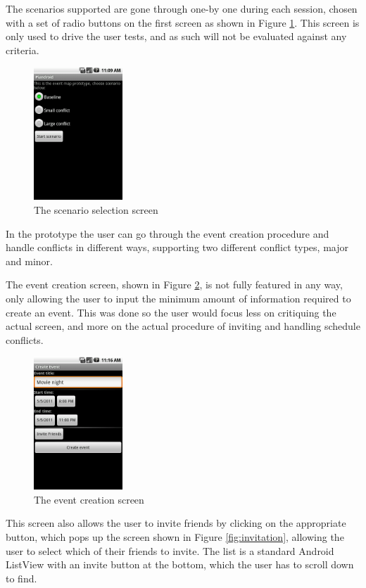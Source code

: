 \documentclass[]{report}
\begin{document}
The scenarios supported are gone through one-by one during each session, chosen
with a set of radio buttons on the first screen as shown in Figure
\ref{fig:scenario}. This screen is only used to drive the user tests, and as
such will not be evaluated against any criteria.

\begin{figure}[htb]
  \centering
  \includegraphics[height=50mm]{scenario}
  \caption{The scenario selection screen}
  \label{fig:scenario}
\end{figure}

In the prototype the user can go through the event creation procedure and handle
conflicts in different ways, supporting two different conflict types, major and
minor.

The event creation screen, shown in Figure \ref{fig:creation}, is not fully
featured in any way, only allowing the user to input the minimum amount of
information required to create an event. This was done so the user would focus
less on critiquing the actual screen, and more on the actual procedure of
inviting and handling schedule conflicts.

\begin{figure}[htb]
  \centering
  \includegraphics[height=50mm]{eventcreation}
  \caption{The event creation screen}
  \label{fig:creation}
\end{figure}

This screen also allows the user to invite friends by clicking on the
appropriate button, which pops up the screen shown in Figure
\ref{fig:invitation}, allowing the user to select which of their friends to
invite. The list is a standard Android ListView with an invite button at the
bottom, which the user has to scroll down to find.
\end{document}
